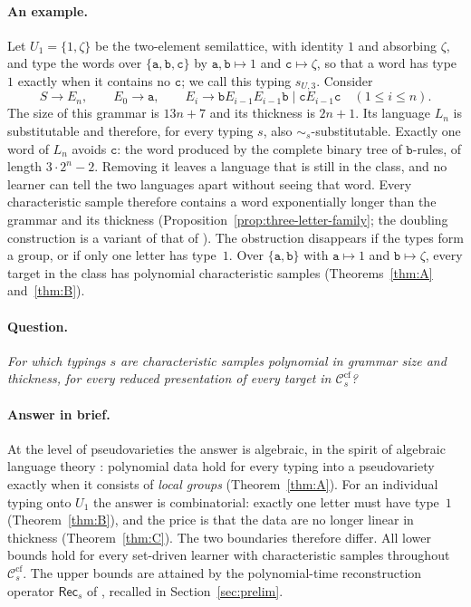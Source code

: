 \documentclass[11pt]{article}
\numberwithin{equation}{section}
\theoremstyle{plain}
\theoremstyle{definition}
\theoremstyle{remark}
\theoremstyle{plain}
\newcommand{\cf}{\mathrm{cf}}
\newcommand{\Ccf}[1]{\mathcal C_{#1}^{\cf}}
\newcommand{\Rec}{\mathsf{Rec}}
\begin{document}
\paragraph{An example.}
Let $U_1=\{1,\zeta\}$ be the two-element semilattice, with identity $1$ and
absorbing $\zeta$, and type the words over $\{\mathtt a,\mathtt b,\mathtt c\}$
by $\mathtt a,\mathtt b\mapsto1$ and $\mathtt c\mapsto\zeta$, so that a word
has type $1$ exactly when it contains no $\mathtt c$; we call this typing
$s_{U,3}$.  Consider
\[
 S\to E_n,\qquad E_0\to\mathtt a,\qquad
 E_i\to\mathtt bE_{i-1}E_{i-1}\mathtt b\mid\mathtt cE_{i-1}\mathtt c
 \quad(1\le i\le n).
\]
The size of this grammar is $13n+7$ and its thickness is $2n+1$.  Its
language $L_n$ is substitutable and therefore, for every typing $s$, also
$\sim_s$-substitutable.  Exactly one word of $L_n$ avoids $\mathtt c$: the word produced by the
complete binary tree of $\mathtt b$-rules, of length $3\cdot2^n-2$.  Removing
it leaves a language that is still in the class, and no learner can tell the
two languages apart without seeing that word.  Every characteristic sample
therefore contains a word exponentially longer than the grammar and its
thickness \textup(Proposition~\ref{prop:three-letter-family}; the doubling
construction is a variant of that of
\cite[Proposition~6.4]{kuriyamaCFG}\textup).  The obstruction disappears if the types form a group, or if only
one letter has type~$1$.  Over $\{\mathtt a,\mathtt b\}$ with
$\mathtt a\mapsto1$ and $\mathtt b\mapsto\zeta$, every target in the class
has polynomial characteristic samples
\textup(Theorems~\ref{thm:A} and~\ref{thm:B}\textup).

\paragraph{Question.}
\emph{For which typings $s$ are characteristic samples polynomial in grammar
size and thickness, for every reduced presentation of every target in
$\Ccf{s}$?}

\paragraph{Answer in brief.}
At the level of pseudovarieties the answer is algebraic, in the spirit of
algebraic language theory \cite{Pin1986}: polynomial data hold for every
typing into a pseudovariety exactly when it consists of \emph{local groups}
(Theorem~\ref{thm:A}).  For an individual typing onto $U_1$ the answer is
combinatorial: exactly one letter must have type~$1$ (Theorem~\ref{thm:B}),
and the price is that the data are no longer linear in thickness
(Theorem~\ref{thm:C}).  The two boundaries therefore differ.  All lower
bounds hold for every set-driven learner with characteristic samples
throughout $\Ccf{s}$.  The upper bounds are attained by the polynomial-time
reconstruction operator $\Rec_s$ of \cite{kuriyamaCFG}, recalled in
Section~\ref{sec:prelim}.
\end{document}
